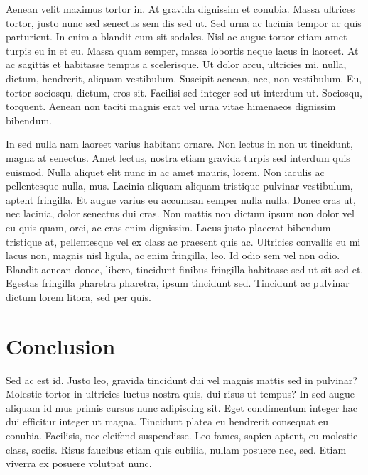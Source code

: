 \documentclass[
  12,
]{article}
\begin{document}
Aenean velit maximus tortor in. At gravida dignissim et conubia. Massa
ultrices tortor, justo nunc sed senectus sem dis sed ut. Sed urna ac
lacinia tempor ac quis parturient. In enim a blandit cum sit sodales.
Nisl ac augue tortor etiam amet turpis eu in et eu. Massa quam semper,
massa lobortis neque lacus in laoreet. At ac sagittis et habitasse
tempus a scelerisque. Ut dolor arcu, ultricies mi, nulla, dictum,
hendrerit, aliquam vestibulum. Suscipit aenean, nec, non vestibulum. Eu,
tortor sociosqu, dictum, eros sit. Facilisi sed integer sed ut interdum
ut. Sociosqu, torquent. Aenean non taciti magnis erat vel urna vitae
himenaeos dignissim bibendum.

In sed nulla nam laoreet varius habitant ornare. Non lectus in non ut
tincidunt, magna at senectus. Amet lectus, nostra etiam gravida turpis
sed interdum quis euismod. Nulla aliquet elit nunc in ac amet mauris,
lorem. Non iaculis ac pellentesque nulla, mus. Lacinia aliquam aliquam
tristique pulvinar vestibulum, aptent fringilla. Et augue varius eu
accumsan semper nulla nulla. Donec cras ut, nec lacinia, dolor senectus
dui cras. Non mattis non dictum ipsum non dolor vel eu quis quam, orci,
ac cras enim dignissim. Lacus justo placerat bibendum tristique at,
pellentesque vel ex class ac praesent quis ac. Ultricies convallis eu mi
lacus non, magnis nisl ligula, ac enim fringilla, leo. Id odio sem vel
non odio. Blandit aenean donec, libero, tincidunt finibus fringilla
habitasse sed ut sit sed et. Egestas fringilla pharetra pharetra, ipsum
tincidunt sed. Tincidunt ac pulvinar dictum lorem litora, sed per quis.

\hypertarget{conclusion}{%
\section{Conclusion}\label{conclusion}}

Sed ac est id. Justo leo, gravida tincidunt dui vel magnis mattis sed in
pulvinar? Molestie tortor in ultricies luctus nostra quis, dui risus ut
tempus? In sed augue aliquam id mus primis cursus nunc adipiscing sit.
Eget condimentum integer hac dui efficitur integer ut magna. Tincidunt
platea eu hendrerit consequat eu conubia. Facilisis, nec eleifend
suspendisse. Leo fames, sapien aptent, eu molestie class, sociis. Risus
faucibus etiam quis cubilia, nullam posuere nec, sed. Etiam viverra ex
posuere volutpat nunc.
\end{document}
